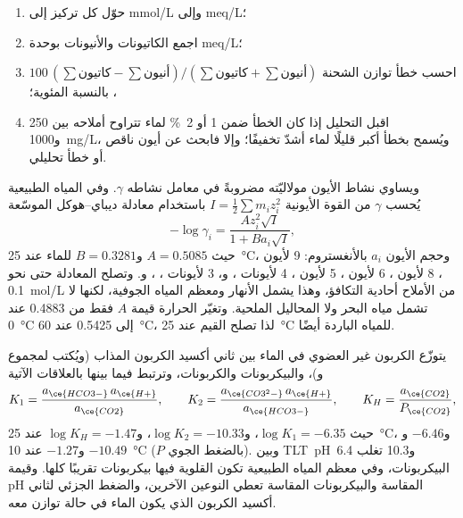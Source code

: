 \begin{method}\label{met:b3:water-rock-interaction:analysis}
\begin{enumerate}
\item حوّل كل تركيز إلى \unit{mmol/L} وإلى \unit{meq/L}؛
\item اجمع الكاتيونات والأنيونات بوحدة \unit{meq/L}؛
\item احسب خطأ توازن الشحنة $100\,(\sum\text{كاتيون} -
  \sum\text{أنيون})/(\sum\text{كاتيون} + \sum\text{أنيون})$، بالنسبة المئوية؛
\item اقبل التحليل إذا كان الخطأ ضمن 1 أو \qty{2}{\percent} لماء
  تتراوح أملاحه بين 250 و\qty{1000}{mg/L}، ويُسمح بخطأ أكبر قليلًا لماء أشدّ تخفيفًا؛
  وإلا فابحث عن أيون ناقص أو خطأ تحليلي.
\end{enumerate}
\end{method}

ويساوي نشاط الأيون مولاليّته مضروبةً في معامل نشاطه
$\gamma$. وفي المياه الطبيعية يُحسب $\gamma$ من القوة الأيونية $I =
\tfrac12\sum m_i z_i^2$ باستخدام معادلة ديباي--هوكل الموسّعة
\[
-\log\gamma_i = \frac{A z_i^2\sqrt I}{1 + B a_i\sqrt I},
\]
حيث $A = 0.5085$ و$B = 0.3281$ للماء عند \qty{25}{\celsius}،
وحجم الأيون $a_i$ بالأنغستروم: 9 لأيون ، 8 لأيون ،
6 لأيون ، 5 لأيون ، 4 لأيونات ،  و،
3 لأيونات ، ،  و. وتصلح المعادلة حتى
نحو \qty{0.1}{mol/L} من الأملاح أحادية التكافؤ، وهذا يشمل الأنهار ومعظم
المياه الجوفية، لكنها لا تشمل مياه البحر ولا المحاليل الملحية. وتغيّر الحرارة قيمة $A$ فقط من
0.4883 عند \qty{0}{\celsius} إلى 0.5425 عند \qty{60}{\celsius}، لذا تصلح القيم عند
\qty{25}{\celsius} للمياه الباردة أيضًا.

يتوزّع الكربون غير العضوي في الماء بين ثاني أكسيد الكربون المذاب
(ويُكتب  لمجموع  و)، والبيكربونات
والكربونات، وترتبط فيما بينها بالعلاقات الآتية
\[
K_1 = \frac{a_{\ce{HCO3-}}\,a_{\ce{H+}}}{a_{\ce{CO2}}}, \qquad
K_2 = \frac{a_{\ce{CO3^2-}}\,a_{\ce{H+}}}{a_{\ce{HCO3-}}}, \qquad
K_H = \frac{a_{\ce{CO2}}}{P_{\ce{CO2}}},
\]
حيث $\log K_1 = -6.35$، و$\log K_2 = -10.33$، و$\log K_H = -1.47$ عند
\qty{25}{\celsius}، و$-6.46$ و$-10.49$ و$-1.27$ عند \qty{10}{\celsius}
($P$ بالضغط الجوي). وبين \mbox{\textdir TLT pH 6.4} و10.3 تغلب البيكربونات، وفي
معظم المياه الطبيعية تكون القلوية فيها بيكربونات تقريبًا كلها. وقيمة pH المقاسة
والبيكربونات المقاسة تعطي النوعين الآخرين، والضغط الجزئي لثاني أكسيد الكربون الذي
يكون الماء في حالة توازن معه.

